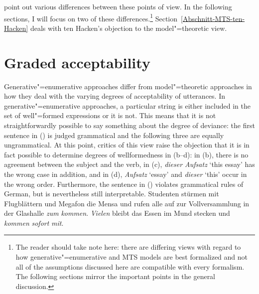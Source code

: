 \citet{PS2001a} point out various differences between these points of view. In the following sections, I will focus on two of these differences.\footnote{%
	The reader should take note here: there are differing views with regard to how generative"=enumerative and MTS models are best formalized and not
	all of the assumptions discussed here are compatible with every formalism. The following sections mirror the important points in the general discussion.%
} Section~\ref{Abschnitt-MTS-ten-Hacken} deals with ten Hacken's objection to the model"=theoretic view.

\section{Graded acceptability}

Generative"=enumerative approaches differ from model"=theoretic approaches in how they deal with the varying degrees of acceptability
of utterances. In generative"=enumerative approaches, a particular string is either included in the set of well"=formed expressions or it is not.
This means that it is not straightforwardly possible to say something about the degree of deviance: the first sentence in () is judged grammatical
and the following three are equally ungrammatical.
\eal
{}
\zl
At this point, critics of this view raise the objection that it is in fact possible to determine degrees of wellformedness
in (b--d): in (b), there is no agreement between the subject and the verb, in
(c),  \emph{dieser Aufsatz} `this essay'  has the wrong case in addition, and in (d),
\emph{Aufsatz} `essay' and \emph{dieser} `this' occur in the wrong order. Furthermore,
 the sentence in () violates grammatical rules of German, but is nevertheless still interpretable.
\ea
\gll Studenten stürmen mit Flugblättern und Megafon die Mensa und rufen alle auf zur Vollversammlung in der Glashalle \emph{zum} \emph{kommen}. \emph{Vielen} bleibt das Essen im Mund stecken und \emph{kommen} \emph{sofort} \emph{mit}.\footnotemark\\
